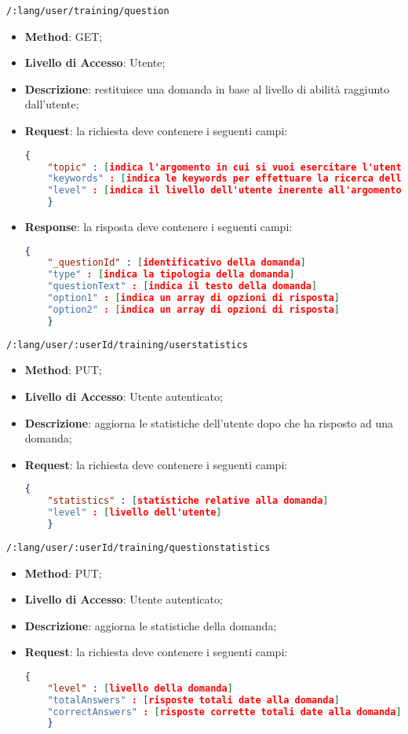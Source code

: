 \item \texttt{/:lang/user/training/question}
\begin{itemize}
	\item \textbf{Method}: GET;
	\item \textbf{Livello di Accesso}: Utente;
	\item \textbf{Descrizione}: restituisce una domanda in base al livello di abilità raggiunto dall'utente;
	\item \textbf{Request}: la richiesta deve contenere i seguenti campi:
	\begin{lstlisting}[language=json,firstnumber=1]
	{
	"topic" : [indica l'argomento in cui si vuoi esercitare l'utente]
	"keywords" : [indica le keywords per effettuare la ricerca della domanda]
	"level" : [indica il livello dell'utente inerente all'argomento scelto]
	}
	\end{lstlisting}
	\item \textbf{Response}: la risposta deve contenere i seguenti campi:
	\begin{lstlisting}[language=json,firstnumber=1]
	{
	"_questionId" : [identificativo della domanda]
	"type" : [indica la tipologia della domanda]
	"questionText" : [indica il testo della domanda]
	"option1" : [indica un array di opzioni di risposta]
	"option2" : [indica un array di opzioni di risposta]
	}
	\end{lstlisting}
\end{itemize}

\item \texttt{/:lang/user/:userId/training/userstatistics}
\begin{itemize}
	\item \textbf{Method}: PUT;
	\item \textbf{Livello di Accesso}: Utente autenticato;
	\item \textbf{Descrizione}: aggiorna le statistiche dell'utente dopo che ha risposto ad una domanda;
	\item \textbf{Request}: la richiesta deve contenere i seguenti campi:
	\begin{lstlisting}[language=json,firstnumber=1]
	{
	"statistics" : [statistiche relative alla domanda]
	"level" : [livello dell'utente]
	}
	\end{lstlisting}	
\end{itemize}

\item \texttt{/:lang/user/:userId/training/questionstatistics}
\begin{itemize}
	\item \textbf{Method}: PUT;
	\item \textbf{Livello di Accesso}: Utente autenticato;
	\item \textbf{Descrizione}: aggiorna le statistiche della domanda;
	\item \textbf{Request}: la richiesta deve contenere i seguenti campi:
	\begin{lstlisting}[language=json,firstnumber=1]
	{
	"level" : [livello della domanda]
	"totalAnswers" : [risposte totali date alla domanda]
	"correctAnswers" : [risposte corrette totali date alla domanda]
	}
	\end{lstlisting}
\end{itemize}

